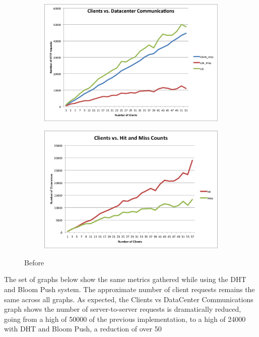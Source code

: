 \documentclass[conference]{IEEEtran}
\begin{document}
\begin{figure}[!h]
	\centering
	\begin{subfigure}[b]{0.49\columnwidth}
		\centering
		\includegraphics[width=\columnwidth]{figures/client-server.png}
	\end{subfigure}
	\begin{subfigure}[b]{0.49\columnwidth}
		\centering
		\includegraphics[width=\columnwidth]{figures/hit_miss_separate.png}
	\end{subfigure}
	\caption{Before}
\end{figure}

The set of graphs below show the same metrics gathered while using the DHT and Bloom Push system. The approximate number of client requests remains the same across all graphs. As expected, the Clients vs DataCenter Communications graph shows the number of server-to-server requests is dramatically reduced, going from a high of 50000 of the previous implementation, to a high of 24000 with DHT and Bloom Push, a reduction of over 50%
\end{document}
